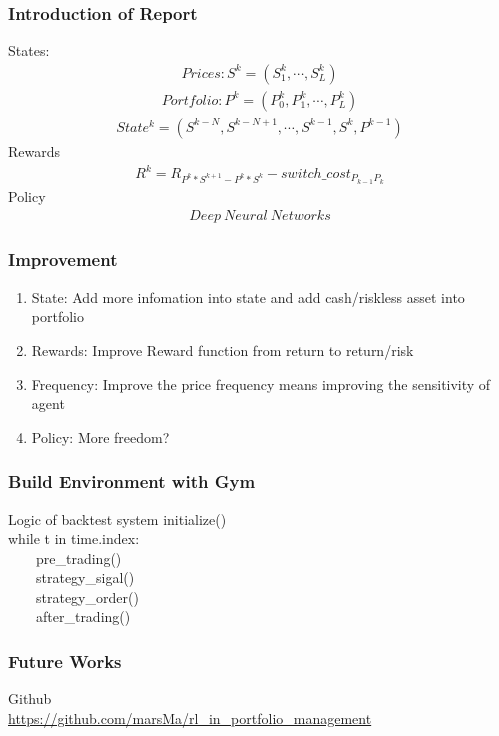 \documentclass[11pt]{beamer}
\begin{document}
\begin{frame}[c]\frametitle{Introduction of Report}
    States:
    \begin{align*}
        Prices: S^{k}=(S_{1}^{k},\cdots,S_{L}^{k})
    \end{align*}
    \begin{align*}
        Portfolio: P^{k}=(P_{0}^{k},P_{1}^{k},\cdots,P_{L}^{k})
    \end{align*}
    \begin{align*}
        State^{k}=(S^{k-N},S^{k-N+1},\cdots,S^{k-1},S^{k},P^{k-1})
    \end{align*}
    Rewards
    \begin{align*}
        R^{k}=R_{P^{k}*S^{k+1}-P^{k}*S^{k}}-switch\_cost_{P_{k-1}P_{k}}
    \end{align*}
    Policy
    \begin{align*}
        Deep\ Neural\ Networks
    \end{align*}

\end{frame}

\begin{frame}[c]\frametitle{Improvement}
    \begin{enumerate}
        \item State: Add more infomation into state and add cash/riskless asset into portfolio
        \item Rewards: Improve Reward function from return to return/risk
        \item Frequency: Improve the price frequency means improving the sensitivity of agent
        \item Policy: More freedom?
    \end{enumerate}
\end{frame}

\begin{frame}[c]\frametitle{Build Environment with Gym}
    \begin{block}{Logic of backtest system}
    initialize()\\
    while t in time.index:\\ \ \ \ \ pre\_trading()\\ \ \ \ \ strategy\_sigal()\\ \ \ \ \  strategy\_order()\\ \ \ \ \ after\_trading()
    \end{block}
\end{frame}

\begin{frame}[c]\frametitle{Future Works}
Github\\\url{https://github.com/marsMa/rl_in_portfolio_management}
\end{frame}
\end{document}

